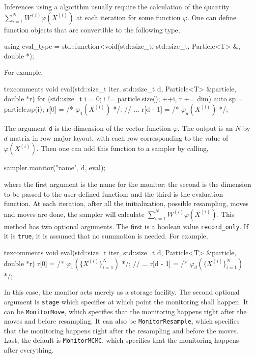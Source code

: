 Inferences using a \smc algorithm usually require the calculation of the
quantity $\sum_{i=1}^NW^{(i)}\varphi(X^{(i)})$ at each iteration for some
function $\varphi$. One can define function objects that are convertible to the
following type,
\begin{cppcode}
  using eval_type =
      std::function<void(std::size_t, std::size_t, Particle<T> &, double *);
\end{cppcode}
For example,
\begin{cppcode*}{texcomments}
  void eval(std::size_t iter, std::size_t d, Particle<T> &particle, double *r)
  {
      for (std::size_t i = 0; i != particle.size(); ++i, r += dim) {
          auto sp = particle.sp(i);
          r[0] = /* $\varphi_1(X^{(i)})$ */;
          // ...
          r[d - 1] = /* $\varphi_d(X^{(i)})$ */;
      }
  }
\end{cppcode*}
The argument \verb|d| is the dimension of the vector function $\varphi$. The
output is an $N$ by $d$ matrix in row major layout, with each row corresponding
to the value of $\varphi(X^{(i)})$. Then one can add this function to a sampler
by calling,
\begin{cppcode}
  sampler.monitor("name", d, eval);
\end{cppcode}
where the first argument is the name for the monitor; the second is the
dimension to be passed to the user defined function; and the third is the
evaluation function. At each iteration, after all the initialization, possible
resampling, moves and \mcmc moves are done, the sampler will calculate
$\sum_{i=1}^NW^{(i)}\varphi(X^{(i)})$. This method has two optional arguments.
The first is a boolean value \verb|record_only|. If it is \verb|true|, it is
assumed that no summation is needed. For example,
\begin{cppcode*}{texcomments}
  void eval(std::size_t iter, std::size_t d, Particle<T> &particle, double *r)
  {
      r[0] = /* $\varphi_1(\{X^{(i)}\}_{i=1}^N)$ */;
      // ...
      r[d - 1] = /* $\varphi_d(\{X^{(i)}\}_{i=1}^N)$ */;
  }
\end{cppcode*}
In this case, the monitor acts merely as a storage facility. The second
optional argument is \verb|stage| which specifies at which point the monitoring
shall happen. It can be \verb|MonitorMove|, which specifies that the monitoring
happens right after the moves and before resampling. It can also be
\verb|MonitorResample|, which specifies that the monitoring happens right after
the resampling and before the \mcmc moves. Last, the default is
\verb|MonitorMCMC|, which specifies that the monitoring happens after
everything.

